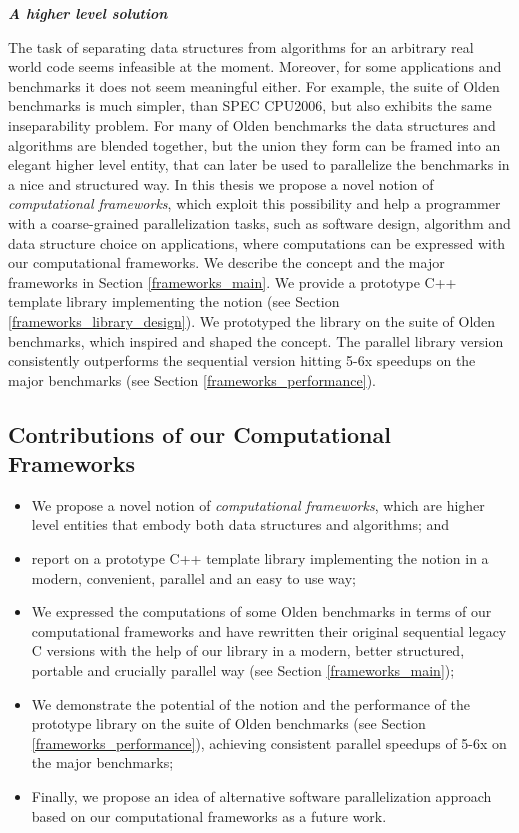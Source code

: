 \begin{center}
\textbf{\large \textit{A higher level solution}}
\end{center}
\quad The task of separating data structures from algorithms for an arbitrary real world code seems infeasible at the moment. Moreover, for some applications and benchmarks it does not seem meaningful either. For example, the suite of Olden benchmarks is much simpler, than SPEC CPU2006, but also exhibits the same inseparability problem. For many of Olden benchmarks the data structures and algorithms are blended together, but the union they form can be framed into an elegant higher level entity, that can later be used to parallelize the benchmarks in a nice and structured way.\newline\null
\quad In this thesis we propose a novel notion of \textit{computational frameworks}, which exploit this possibility and help a programmer with a coarse-grained parallelization tasks, such as software design, algorithm and data structure choice on applications, where computations can be expressed with our computational frameworks. We describe the concept and the major frameworks in Section \ref{frameworks_main}. We provide a prototype C++ template library implementing the notion \cite{frameworks-repo} (see Section \ref{frameworks_library_design}). We prototyped the library on the suite of Olden benchmarks, which inspired and shaped the concept. The parallel library version consistently outperforms the sequential version hitting 5-6x speedups on the major benchmarks (see Section \ref{frameworks_performance}).
\subsection{Contributions of our Computational Frameworks}
\begin{itemize}[style=unboxed,leftmargin=0cm]
\itemsep0em
\renewcommand\labelitemi{$\vartriangleright$}
\renewcommand\labelitemii{$\bullet$}
\item We propose a novel notion of \textit{computational frameworks}, which are higher level entities that embody both data structures and algorithms; and
\item report on a prototype C++ template library \cite{frameworks-repo} implementing the notion in a modern, convenient, parallel and an easy to use way;
\item We expressed the computations of some Olden benchmarks in terms of our computational frameworks and have rewritten their original sequential legacy C versions with the help of our library in a modern, better structured, portable and crucially parallel way (see Section \ref{frameworks_main});
\item We demonstrate the potential of the notion and the performance of the prototype library on the suite of Olden benchmarks (see Section \ref{frameworks_performance}), achieving consistent parallel speedups of 5-6x on the major benchmarks;
\item Finally, we propose an idea of alternative software parallelization approach based on our computational frameworks as a future work.
\end{itemize}
